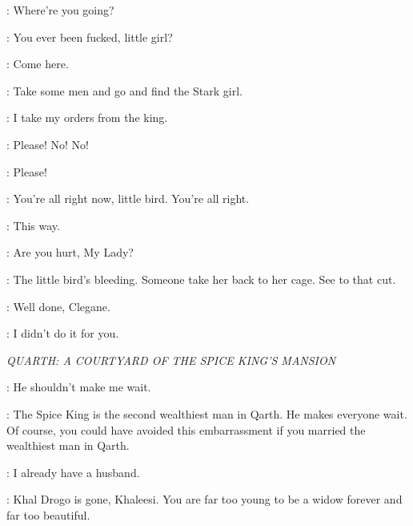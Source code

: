
\RIOTERb: Where're you going?


\RIOTERa: You ever been fucked, little girl?

\RIOTERb: Come here.

\TYRION: Take some men and go and find the Stark girl. 

\MERYN: I take my orders from the king.



\SANSA: Please! No! No!


\RIOTERb: Please! 

\HOUND: You're all right now, little bird. You're all right.


\HOUND: This way.

\TYRION: Are you hurt, My Lady?


\HOUND: The little bird's bleeding. Someone take her back to her cage. See to that cut. 

\TYRION: Well done, Clegane. 

\HOUND: I didn't do it for you. 


\scene

\textit{QUARTH: A COURTYARD OF THE SPICE KING'S MANSION}


\DAENERYS: He shouldn't make me wait. 

\XARO: The Spice King is the second wealthiest man in Qarth. He makes everyone wait. Of course, you could have avoided this embarrassment if you married the wealthiest man in Qarth. 

\DAENERYS: I already have a husband. 

\XARO: Khal Drogo is gone, Khaleesi. You are far too young to be a widow forever and far too beautiful. 

